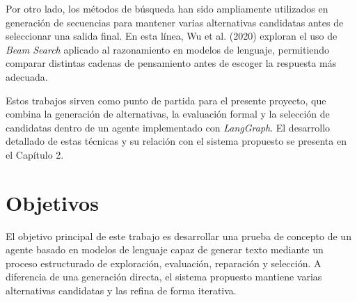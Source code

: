 \documentclass[12pt,a4paper,twoside,openright]{book}
\begin{document}
Por otro lado, los métodos de búsqueda han sido ampliamente utilizados en generación de secuencias para mantener varias alternativas candidatas antes de seleccionar una salida final.
En esta línea, Wu et al. (2020) \cite{wu2016google} exploran el uso de \emph{Beam Search} aplicado al razonamiento en modelos de lenguaje, permitiendo comparar distintas cadenas de pensamiento antes de escoger la respuesta más adecuada.

Estos trabajos sirven como punto de partida para el presente proyecto, que combina la generación de alternativas, la evaluación formal y la selección de candidatas dentro de un agente implementado con \emph{LangGraph}.
El desarrollo detallado de estas técnicas y su relación con el sistema propuesto se presenta en el Capítulo 2.


\section{Objetivos}





El objetivo principal de este trabajo es desarrollar una prueba de concepto de un agente basado en modelos de lenguaje capaz de generar texto mediante un proceso estructurado de exploración, evaluación, reparación y selección.
A diferencia de una generación directa, el sistema propuesto mantiene varias alternativas candidatas y las refina de forma iterativa.
\end{document}
